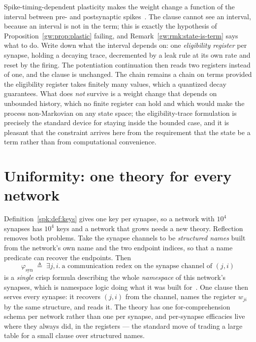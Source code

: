 \begin{remark}
\label{spk:rmk:stdp}
Spike-timing-dependent plasticity makes the weight change a function of the interval
between pre- and postsynaptic spikes~\cite{stdp}. The clause cannot see an interval,
because an interval is not in the term; this is exactly the hypothesis of
Proposition~\ref{gw:prop:plastic} failing, and Remark~\ref{gw:rmk:state-is-term} says
what to do. Write down what the interval depends on: one \emph{eligibility register} per
synapse, holding a decaying trace, decremented by a leak rule at its own rate and reset by
the firing. The potentiation continuation then reads two registers instead of one, and
the clause is unchanged. The chain remains a chain on terms provided the eligibility
register takes finitely many values, which a quantized decay guarantees. What does
\emph{not} survive is a weight change that depends on unbounded history, which no
finite register can hold and which would make the process non-Markovian on any state
space; the eligibility-trace formulation is precisely the standard device for staying
inside the bounded case, and it is pleasant that the constraint arrives here from the
requirement that the state be a term rather than from computational convenience.
\end{remark}

\section{Uniformity: one theory for every network}
\label{spk:sec:uniform}

Definition~\ref{spk:def:keys} gives one key per synapse, so a network with $10^4$
synapses has $10^4$ keys and a network that grows needs a new theory. Reflection removes
both problems. Take the synapse channels to be \emph{structured names} built from the
network's own name and the two endpoint indices, so that a name predicate can recover the
endpoints. Then
\[
  \varphi_{\mathrm{syn}} \;\triangleq\;
  \exists j, i.\ \text{a communication redex on the synapse channel of } (j,i)
\]
is a \emph{single} crisp formula describing the whole \emph{namespace} of this
network's synapses, which is namespace logic doing what it was built
for~\cite{NamespaceLogic}. One clause then serves every synapse: it recovers $(j,i)$
from the channel, names the register $w_{ji}$ by the same structure, and reads it. The
theory has one for-comprehension schema per network rather than one per synapse, and
per-synapse efficacies live where they always did, in the registers --- the standard move
of trading a large table for a small clause over structured names.

